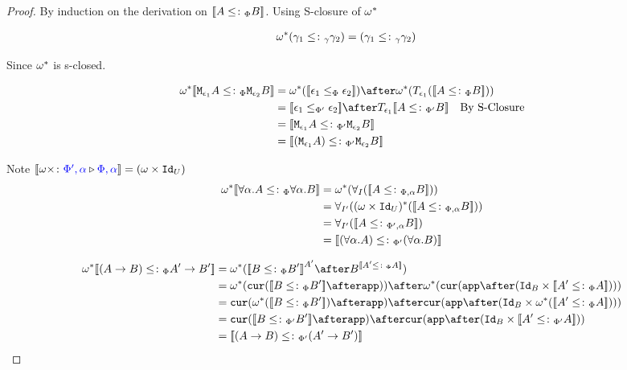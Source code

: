 \documentclass{report}
\begin{document}
\begin{framed}
    
    \begin{proof}
        
        By induction on the derivation on ${\bf [\![}A\leq\colon_\Phi B{\bf ]\!]}$. Using S-closure of $\omega^*$ 
        
        \begin{align*}
            \omega^*(\gamma_1\leq\colon_\gamma\gamma_2) &= (\gamma_1\leq\colon_\gamma\gamma_2)
        \end{align*}
        
        Since $\omega^*$ is s-closed.
        
        \begin{align*}
            \w\star\deno{\M{\e_1}{A} \subtypep \M{\e_2}{B}} & = \w\star(\deno{\e_1\subeffectp\e_2})\after\w\star(\T{\e_1}(\deno{A\subtypep B})) \\ 
             &= \deno{\e_1\subeffectpp\e_2} \after \T{\e_1}{\deno{A\subtypepp B}}\qt{By S-Closure}\\
             &= \deno{\M{\e_1}{A}\subtypepp\M{\e_2}{B}}\\
             &= \deno{(\M{\e_1}{A})\subtypepp\M{\e_2}{B}}\\
        \end{align*}
        
        Note ${\bf [\![}\omega\times \colon {\color{blue}\Phi',\alpha} \triangleright {\color {blue} \Phi,\alpha}{\bf ]\!]} = (\omega\times\texttt{Id}_{U})$
            \begin{align*}
                \w\star\deno{\all{\a}{A}\subtypep\all{\a}{B}} &= \w\star(\allI(\deno{A\subtypepa B})) \\
                &=\allII((\w\times\Id{U})\star(\deno{A\subtypepa B}))\\
                &=\allII(\deno{A\subtypeppa B})\\
                &= \deno{(\all{\a}{A}) \subtypepp(\all{\a}{B})}\\
            \end{align*}
        
        \begin{align*}
            \w\star\deno{(\ab)\subtypep\fntype{A'}{B'}} &= \w\star(\deno{B\subtypep B'}^{A'}\after B^{\deno{A'\subtypep A}})\\
            &= \w\star(\cur{\deno{B\subtypep B'}\after\app})\after\w\star(\cur{\app\after(\Id{B}\times\deno{A'\subtypep A})})\\
            & = \cur{\w\star(\deno{B\subtypep B'})\after\app}\after\cur{\app\after(\Id{B}\times\w\star(\deno{A'\subtypep A}))}\\
            & = \cur{\deno{B\subtypepp B'}\after\app}\after\cur{\app\after(\Id{B}\times\deno{A'\subtypepp A})}\\
            &= \deno{(\ab)\subtypepp(\fntype{A'}{B'})}
        \end{align*}
    \end{proof}
    
\end{framed}
\end{document}
